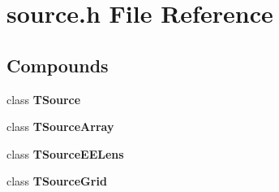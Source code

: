 \section{source.h File Reference}
\label{source.h}


\subsection*{Compounds}
\begin{CompactItemize}
\item 
class {\bf TSource}
\item 
class {\bf TSource\-Array}
\item 
class {\bf TSource\-EELens}
\item 
class {\bf TSource\-Grid}
\end{CompactItemize}
